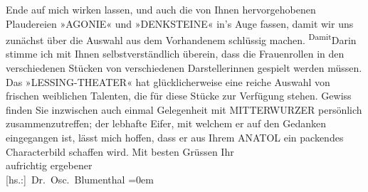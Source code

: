 \begin{ledgroupsized}[t]{13cm}
                    Ende auf mich wirken lassen, und auch die von Ihnen hervorgehobenen Plaudereien
                        »AGONIE« und »DENKSTEINE« in’s Auge
                    fassen, damit wir uns zunächst über die Auswahl aus dem Vorhandenem schlüssig
                    machen. \substVorne{}\textsuperscript{Damit}\substDazwischen{}Darin\substHinten{} stimme ich mit Ihnen selbstverständlich überein, dass die Frauenrollen
                    in den verschiedenen Stücken von verschiedenen Darstellerinnen gespielt werden
                    müssen. Das »LESSING-THEATER« hat glücklicherweise eine reiche Auswahl {\pb}von frischen weiblichen Talenten,
                    die für diese Stücke zur Verfügung stehen. Gewiss finden Sie inzwischen auch
                    einmal Gelegenheit mit MITTERWURZER persönlich zusammenzutreffen; der lebhafte
                    Eifer, mit welchem er auf den Gedanken eingegangen ist, lässt mich hoffen, dass
                    er aus Ihrem ANATOL
                    ein packendes Characterbild schaffen wird.\pend
           \pstart
           Mit besten Grüssen Ihr{\\[\baselineskip]} aufrichtig ergebener{\\[\baselineskip]}\spacefill\mbox{{[}hs.:{]} Dr. Osc. Blumenthal}\pend
           \leftskip=0em{}          \endnumbering{}\end{ledgroupsized}  \newcommand{\dateiname}{L00623}\newcommand{\titel}{Oscar Blumenthal an Arthur Schnitzler, 19. 11. 1896}\newcommand{\editorInnen}{Martin Anton Müller und Gerd-Hermann Susen}
      